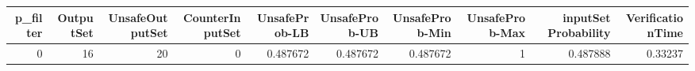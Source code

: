 \begin{tabular}{rrrrrrrrrr}
\hline
   p\_filter &   OutputSet &   UnsafeOutputSet &   CounterInputSet &   UnsafeProb-LB &   UnsafeProb-UB &   UnsafeProb-Min &   UnsafeProb-Max &   inputSet Probability &   VerificationTime \\
\hline
          0 &          16 &                20 &                 0 &        0.487672 &        0.487672 &         0.487672 &                1 &               0.487888 &            0.33237 \\
\hline
\end{tabular}
